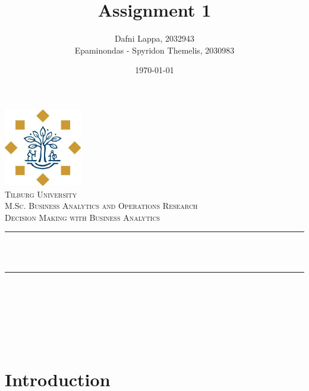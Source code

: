 \documentclass[12pt]{article}
\title{Assignment 1}
\author{ Dafni Lappa, 2032943 \\
	Epaminondas - Spyridon Themelis, 2030983}                               %
\date{\today}                                           %
\makeatletter
\let\thetitle\@title
\let\theauthor\@author
\let\thedate\@date
\makeatother
\begin{document}
	
	
	\begin{titlepage}
		\centering
		\vspace*{0.5 cm}
		\includegraphics[scale = 0.75]{logo.png}\\[1.0 cm]   %
		\textsc{\LARGE Tilburg University}\\[2.0 cm]   %
		\textsc{\Large M.Sc. Business Analytics and Operations Research}\\[0.5 cm]               %
		\textsc{\large Decision Making with Business Analytics}\\[0.5 cm]               %
		\rule{\linewidth}{0.2 mm} \\[0.4 cm]
		{ \huge \bfseries \thetitle}\\
		\rule{\linewidth}{0.2 mm} \\[1.5 cm]
		
		\begin{minipage}{0.4\textwidth}
			\begin{center} \large
				\theauthor
			\end{center}
		\end{minipage}~
		\begin{minipage}{0.4\textwidth}
		\end{minipage}\\[2 cm]
		
		{\large \thedate}\\[2 cm]
		
		\vfill
		
	\end{titlepage}
	
	
	\tableofcontents
	\newpage
	\listoffigures
	\listoftables
	\newpage
	
	
	\section{Introduction}
	
\end{document}
